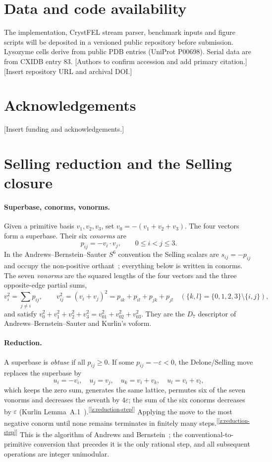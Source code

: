 \documentclass[11pt]{article}
\newcommand{\chk}[1]{\textsuperscript{[\ref{#1}]}}
\begin{document}
\section*{Data and code availability}
The implementation, CrystFEL stream parser, benchmark inputs and figure scripts will be deposited in a versioned public repository before submission. Lysozyme cells derive from public PDB entries (UniProt P00698). Serial data are from CXIDB entry 83. [Authors to confirm accession and add primary citation.] [Insert repository URL and archival DOI.]

\section*{Acknowledgements}
[Insert funding and acknowledgements.]

\appendix

\section{Selling reduction and the Selling closure}
\label{app:closure}

\paragraph{Superbase, conorms, vonorms.}
Given a primitive basis $v_1,v_2,v_3$, set $v_0=-(v_1+v_2+v_3)$. The four vectors form a superbase. Their six \emph{conorms} are
\[
p_{ij}=-v_i\cdot v_j,\qquad 0\le i<j\le3 .
\]
In the Andrews--Bernstein--Sauter $S^6$ convention the Selling scalars are $s_{ij}=-p_{ij}$ and occupy the non-positive orthant~\cite{abs2019}; everything below is written in conorms. The seven \emph{vonorms} are the squared lengths of the four vectors and the three opposite-edge partial sums,
\[
v_i^2=\sum_{j\ne i}p_{ij},\qquad v_{ij}^2=(v_i+v_j)^2=p_{ik}+p_{il}+p_{jk}+p_{jl}\quad(\{k,l\}=\{0,1,2,3\}\setminus\{i,j\}),
\]
and satisfy $v_0^2+v_1^2+v_2^2+v_3^2=v_{01}^2+v_{02}^2+v_{03}^2$. They are the $D_7$ descriptor of Andrews--Bernstein--Sauter and Kurlin's voform.

\paragraph{Reduction.}
A superbase is \emph{obtuse} if all $p_{ij}\ge0$. If some $p_{ij}=-\varepsilon<0$, the Delone/Selling move replaces the superbase by
\[
u_i=-v_i,\quad u_j=v_j,\quad u_k=v_i+v_k,\quad u_l=v_i+v_l,
\]
which keeps the zero sum, generates the same lattice, permutes six of the seven vonorms and decreases the seventh by $4\varepsilon$; the sum of the six conorms decreases by $\varepsilon$ (Kurlin Lemma~A.1~\cite{kurlin2026}).\chk{z:reduction-step} Applying the move to the most negative conorm until none remains terminates in finitely many steps.\chk{z:reduction-step} This is the algorithm of Andrews and Bernstein~\cite{ab1988,ab2014,abs2019}; the conventional-to-primitive conversion that precedes it is the only rational step, and all subsequent operations are integer unimodular.
\end{document}
